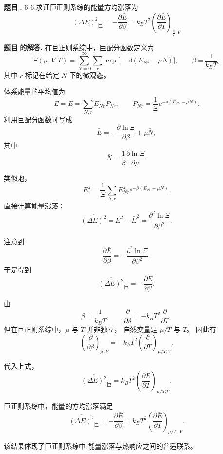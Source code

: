 \documentclass[12pt, a4paper, oneside]{ctexart}
\newcounter{problemname}
\newenvironment{problem}
  {\begin{shaded}\stepcounter{problemname}\par\noindent\textbf{题目 \theproblemname. }}
  {\end{shaded}\par}
\newenvironment{solution}
  {\par\noindent\textbf{题目 \theproblemname 的解答. }}
  {\par}
\begin{document}
\begin{problem}{6-6}
  求证巨正则系综的能量方均涨落为
\begin{equation*}
\overline{(\Delta E)^2}_{\text{巨}} = -\frac{\partial \bar{E}}{\partial \beta} = k_B T^2 \left( \frac{\partial \bar{E}}{\partial T} \right)_{\frac{\mu}{T}, V}
\end{equation*}
\end{problem}

\begin{solution}
  在巨正则系综中，巨配分函数定义为
\[
\Xi(\mu,V,T)
= \sum_{N=0}^{\infty}\sum_r 
\exp\!\big[-\beta(E_{Nr}-\mu N)\big],
\qquad \beta=\frac{1}{k_BT},
\]
其中 $r$ 标记在给定 $N$ 下的微观态。


体系能量的平均值为
\[
\bar E
= \overline{E}
= \sum_{N,r} E_{Nr} P_{Nr},
\qquad
P_{Nr}=\frac{1}{\Xi}e^{-\beta(E_{Nr}-\mu N)} .
\]
利用巨配分函数可写成
\[
\bar E
= -\frac{\partial \ln \Xi}{\partial \beta}
+ \mu \bar N,
\]
其中
\[
\bar N=\frac{1}{\beta}\frac{\partial \ln \Xi}{\partial \mu}.
\]


类似地，
\[
\overline{E^2}
= \frac{1}{\Xi}
\sum_{N,r} E_{Nr}^2 e^{-\beta(E_{Nr}-\mu N)} .
\]
直接计算能量涨落：
\[
\overline{(\Delta E)^2}
= \overline{E^2}-\bar E^2
= \frac{\partial^2 \ln \Xi}{\partial \beta^2}.
\]

注意到
\[
\frac{\partial \bar E}{\partial \beta}
= -\frac{\partial^2 \ln \Xi}{\partial \beta^2},
\]
于是得到
\[
\boxed{
\overline{(\Delta E)^2}_{\text{巨}}
= -\frac{\partial \bar E}{\partial \beta}
}.
\]


由
\[
\beta=\frac{1}{k_BT},
\qquad
\frac{\partial}{\partial\beta}
= -k_BT^2\frac{\partial}{\partial T},
\]
但在巨正则系综中，$\mu$ 与 $T$ 并非独立，
自然变量是 $\mu/T$ 与 $T$。
因此有
\[
\left(\frac{\partial}{\partial\beta}\right)_{\mu,V}
= -k_BT^2
\left(\frac{\partial}{\partial T}\right)_{\mu/T,V}.
\]

代入上式，
\[
\overline{(\Delta E)^2}_{\text{巨}}
= k_BT^2
\left(\frac{\partial \bar E}{\partial T}\right)_{\mu/T,V}.
\]


巨正则系综中，能量的方均涨落满足
\[
\boxed{
\overline{(\Delta E)^2}_{\text{巨}}
= -\frac{\partial \bar E}{\partial \beta}
= k_BT^2
\left( \frac{\partial \bar E}{\partial T} \right)_{\mu/T,\,V}
}.
\]

该结果体现了巨正则系综中
能量涨落与热响应之间的普适联系。

\end{solution}
\end{document}
